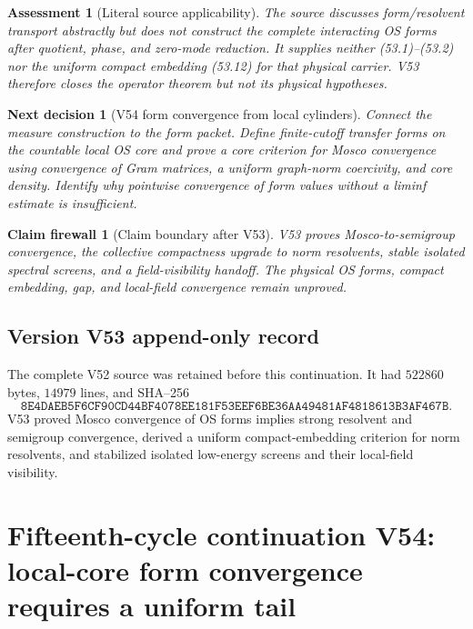 \documentclass[11pt]{article}
\newtheorem{firewall}[theorem]{Claim firewall}
\newtheorem{decision}[theorem]{Next decision}
\newtheorem{assessment}[theorem]{Assessment}
\theoremstyle{remark}
\begin{document}
\begin{assessment}[Literal source applicability]
\label{ass:v15v53-source}
The source discusses form/resolvent transport abstractly but does
not construct the complete interacting OS forms after quotient,
phase, and zero-mode reduction.  It supplies neither (53.1)--(53.2)
nor the uniform compact embedding (53.12) for that physical
carrier.  V53 therefore closes the operator theorem but not its
physical hypotheses.
\end{assessment}

\begin{decision}[V54 form convergence from local cylinders]
\label{dec:v15v53-next}
Connect the measure construction to the form packet.  Define
finite-cutoff transfer forms on the countable local OS core and
prove a core criterion for Mosco convergence using convergence of
Gram matrices, a uniform graph-norm coercivity, and core density.
Identify why pointwise convergence of form values without a
liminf estimate is insufficient.
\end{decision}

\begin{firewall}[Claim boundary after V53]
\label{fire:v15v53}
V53 proves Mosco-to-semigroup convergence, the collective
compactness upgrade to norm resolvents, stable isolated spectral
screens, and a field-visibility handoff.  The physical OS forms,
compact embedding, gap, and local-field convergence remain
unproved.
\end{firewall}

\section*{Version V53 append-only record}
The complete V52 source was retained before this continuation.  It
had \(522860\) bytes, \(14979\) lines, and SHA--256
\[
 \texttt{8E4DAEB5F6CF90CD44BF4078EE181F53EEF6BE36AA49481AF4818613B3AF467B}.
\]
V53 proved Mosco convergence of OS forms implies strong resolvent
and semigroup convergence, derived a uniform compact-embedding
criterion for norm resolvents, and stabilized isolated low-energy
screens and their local-field visibility.

\chapter{Fifteenth-cycle continuation V54: local-core form convergence requires a uniform tail}
\label{sec:v15v54}
\end{document}
